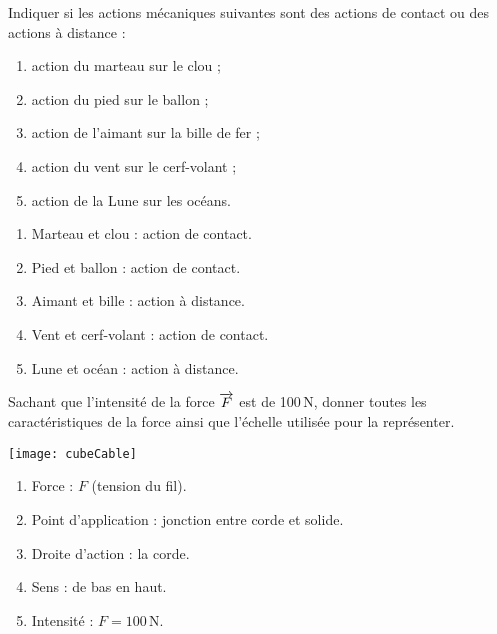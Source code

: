\begin{exercice}
Indiquer si les actions mécaniques suivantes sont des actions de contact ou des actions à distance :
\begin{enumerate}
\item action du marteau sur le clou ;
\item action du pied sur le ballon ;
\item action de l'aimant sur la bille de fer ;
\item action du vent sur le cerf-volant ;
\item action de la Lune sur les océans.
\end{enumerate}
\end{exercice}


\begin{corrige}
\begin{enumerate}
\item Marteau et clou : action de contact.
\item Pied et ballon : action de contact.
\item Aimant et bille : action à distance.
\item Vent et cerf-volant : action de contact.
\item Lune et océan : action à distance.
\end{enumerate}
\end{corrige}















\begin{exercice}
Sachant que l'intensité de la force $\overrightarrow{F}$ est de 100\,N, donner toutes les caractéristiques de la force ainsi que l'échelle utilisée pour la représenter.

\vspace{1em}
\begin{center}
    \texttt{[image: cubeCable]}
\end{center}

\end{exercice}


\begin{corrige}
\begin{enumerate}
\item Force : $F$ (tension du fil).
\item Point d'application : jonction entre corde et solide.
\item Droite d'action : la corde.
\item Sens : de bas en haut.
\item Intensité : $F=100$\,N. 
\end{enumerate}
\end{corrige}







